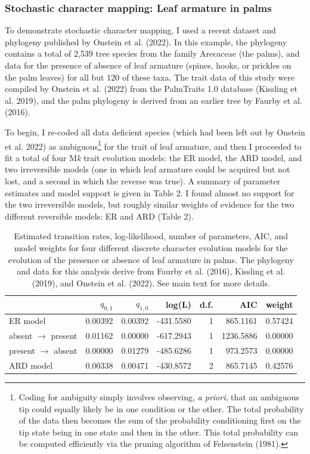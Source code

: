 \documentclass{article}
\begin{document}
\subsubsection{Stochastic character mapping: Leaf armature in palms}\label{stochastic-character-mapping-leaf-armature-in-palms}

To demonstrate stochastic character mapping, I used a recent dataset and phylogeny published by Onstein et al. (2022). In this example, the phylogeny contains a total of 2,539 tree species from the family Arecaceae (the palms), and data for the presence of absence of leaf armature (spines, hooks, or prickles on the palm leaves) for all but 120 of these taxa. The trait data of this study were compiled by Onstein et al. (2022) from the PalmTraits 1.0 database (Kissling et al. 2019), and the palm phylogeny is derived from an earlier tree by Faurby et al. (2016).

To begin, I re-coded all data deficient species (which had been left out by Onstein et al. 2022) as ambiguous\footnote{Coding for ambiguity simply involves observing, \emph{a priori}, that an ambiguous tip could equally likely be in one condition or the other. The total probability of the data then becomes the sum of the probability conditioning first on the tip state being in one state and then in the other. This total probability can be computed efficiently via the pruning algorithm of Felsenstein (1981).} for the trait of leaf armature, and then I proceeded to fit a total of four M\emph{k} trait evolution models: the ER model, the ARD model, and two irreversible models (one in which leaf armature could be acquired but not lost, and a second in which the reverse was true). A summary of parameter estimates and model support is given in Table 2. I found almost no support for the two irreversible models, but roughly similar weights of evidence for the two different reversible models: ER and ARD (Table 2).

\begin{table}

\caption{\label{tab:unnamed-chunk-28}Estimated transition rates, log-likelihood, number of parameters, AIC, and model weights for four different discrete character evolution models for the evolution of the presence or absence of leaf armature in palms. The phylogeny and data for this analysis derive from Faurby et al. (2016), Kissling et al. (2019), and Onstein et al. (2022). See main text for more details.}
\centering
\begin{tabular}[t]{l|r|r|r|r|r|r}
\hline
  & $q_{0,1}$ & $q_{1,0}$ & log(L) & d.f. & AIC & weight\\
\hline
ER model & 0.00392 & 0.00392 & -431.5580 & 1 & 865.1161 & 0.57424\\
\hline
absent $\rightarrow$ present & 0.01162 & 0.00000 & -617.2943 & 1 & 1236.5886 & 0.00000\\
\hline
present $\rightarrow$ absent & 0.00000 & 0.01279 & -485.6286 & 1 & 973.2573 & 0.00000\\
\hline
ARD model & 0.00338 & 0.00471 & -430.8572 & 2 & 865.7145 & 0.42576\\
\hline
\end{tabular}
\end{table}
\end{document}
